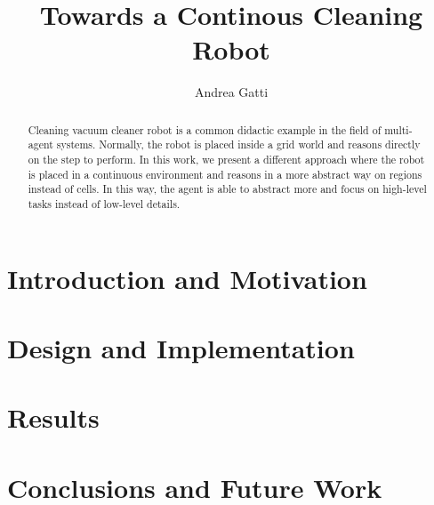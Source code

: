 \documentclass[runningheads]{llncs}
\title{Towards a Continous Cleaning Robot}
\author{Andrea Gatti\orcidID{0009-0003-0992-4058}}
\institute{University of Genoa \\ \email{\url{andrea.gatti@edu.unige.it}}}
\begin{document}
	\maketitle

	\begin{abstract}
    Cleaning vacuum cleaner robot is a common didactic example in the field of multi-agent systems.
    Normally, the robot is placed inside a grid world and reasons directly on the step to perform.
    In this work, we present a different approach where the robot is placed in a continuous environment and reasons in a more abstract way on regions instead of cells.
    In this way, the agent is able to abstract more and focus on high-level tasks instead of low-level details.

	\end{abstract}

	\section{Introduction and Motivation}
	

	\section{Design and Implementation}
	

	\section{Results}
	

	\section{Conclusions and Future Work}
	

  
  
\end{document}
